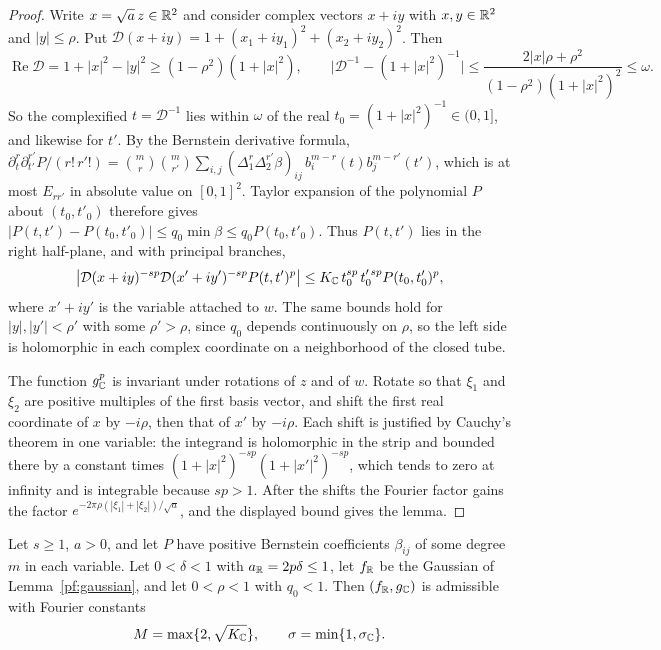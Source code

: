 \begin{proof}
Write $x=\sqrt a\,z\in\mathbb R^2$ and consider complex vectors $x+iy$ with
$x,y\in\mathbb R^2$ and $|y|\le\rho$. Put
$\mathcal D(x+iy)=1+(x_1+iy_1)^2+(x_2+iy_2)^2$. Then
\[
 \operatorname{Re}\mathcal D=1+|x|^2-|y|^2\ge(1-\rho^2)(1+|x|^2),\qquad
 \bigl|\mathcal D^{-1}-(1+|x|^2)^{-1}\bigr|
 \le\frac{2|x|\rho+\rho^2}{(1-\rho^2)(1+|x|^2)^2}\le\omega .
\]
So the complexified $t=\mathcal D^{-1}$ lies within $\omega$ of the real
$t_0=(1+|x|^2)^{-1}\in(0,1]$, and likewise for $t'$. By the Bernstein
derivative formula,
$\partial_t^r\partial_{t'}^{r'}P/(r!\,r'!)=\binom mr\binom m{r'}
\sum_{i,j}(\Delta_1^r\Delta_2^{r'}\beta)_{ij}\,b_i^{m-r}(t)b_j^{m-r'}(t')$,
which is at most $E_{rr'}$ in absolute value on $[0,1]^2$. Taylor
expansion of the polynomial $P$ about $(t_0,t'_0)$ therefore gives
$|P(t,t')-P(t_0,t'_0)|\le q_0\min\beta\le q_0P(t_0,t'_0)$. Thus
$P(t,t')$ lies in the right half-plane, and with principal branches,
\[
 \bigl|\mathcal D(x+iy)^{-sp}\mathcal D(x'+iy')^{-sp}P(t,t')^p\bigr|
 \le K_\mathbb C\,t_0^{sp}\,t_0'^{\,sp}P(t_0,t'_0)^p ,
\]
where $x'+iy'$ is the variable attached to $w$. The same bounds hold
for $|y|,|y'|<\rho'$ with some $\rho'>\rho$, since $q_0$ depends
continuously on $\rho$, so the left side is holomorphic in each complex
coordinate on a neighborhood of the closed tube.

The function $g_\mathbb C^p$ is invariant under rotations of $z$ and of $w$.
Rotate so that $\xi_1$ and $\xi_2$ are positive multiples of the first
basis vector, and shift the first real coordinate of $x$ by $-i\rho$,
then that of $x'$ by $-i\rho$. Each shift is justified by Cauchy's
theorem in one variable: the integrand is holomorphic in the strip and
bounded there by a constant times $(1+|x|^2)^{-sp}(1+|x'|^2)^{-sp}$,
which tends to zero at infinity and is integrable because $sp>1$. After
the shifts the Fourier factor gains the factor
$e^{-2\pi\rho(|\xi_1|+|\xi_2|)/\sqrt a}$, and the displayed bound gives
the lemma.
\end{proof}

\begin{proposition}\label{pf:admissible}
Let $s\ge1$, $a>0$, and let $P$ have positive Bernstein coefficients
$\beta_{ij}$ of some degree $m$ in each variable. Let $0<\delta<1$ with
$a_\mathbb R=2p\delta\le1$, let $f_\mathbb R$ be the Gaussian of
Lemma~\ref{pf:gaussian}, and let $0<\rho<1$ with $q_0<1$. Then
$(f_\mathbb R,g_\mathbb C)$ is admissible with Fourier constants
\begin{equation}\label{pf:polynomial-fourier-contract}
 M=\max\{2,\sqrt{K_\mathbb C}\},\qquad \sigma=\min\{1,\sigma_\mathbb C\}.
\end{equation}
\end{proposition}

